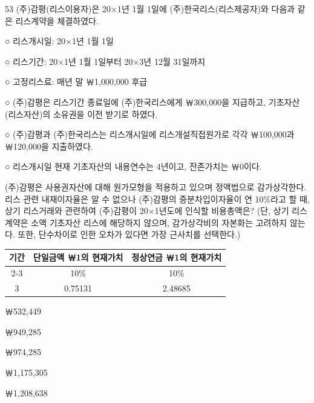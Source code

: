 \begin{question}{53}
(주)감평(리스이용자)은 20×1년 1월 1일에 (주)한국리스(리스제공자)와 다음과 같은 리스계약을 체결하였다.
\begin{framedtext}
○ 리스개시일: 20×1년 1월 1일 \par
○ 리스기간: 20×1년 1월 1일부터 20×3년 12월 31일까지 \par
○ 고정리스료: 매년 말 ￦1,000,000 후급 \par
○ (주)감평은 리스기간 종료일에 (주)한국리스에게 ￦300,000을 지급하고, 기초자산(리스자산)의 소유권을 이전 받기로 하였다. \par
○ (주)감평과 (주)한국리스는 리스개시일에 리스개설직접원가로 각각 ￦100,000과 ￦120,000을 지출하였다. \par
○ 리스개시일 현재 기초자산의 내용연수는 4년이고, 잔존가치는 ￦0이다. \par
\end{framedtext}
(주)감평은 사용권자산에 대해 원가모형을 적용하고 있으며 정액법으로 감가상각한다. 리스 관련 내재이자율은 알 수 없으나 (주)감평의 증분차입이자율이 연 10\%라고 할 때, 상기 리스거래와 관련하여 (주)감평이 20×1년도에 인식할 비용총액은? (단, 상기 리스계약은 소액 기초자산 리스에 해당하지 않으며, 감가상각비의 자본화는 고려하지 않는다. 또한, 단수차이로 인한 오차가 있다면 가장 근사치를 선택한다.)
\par{\small\centering\begin{tabular}{|c|c|c|}\hline
\multirow{2}{*}{기간} & 단일금액 ￦1의 현재가치 & 정상연금 ￦1의 현재가치 \\ \cline{2-3}
 & 10\% & 10\% \\ \hline
3 & 0.75131 & 2.48685 \\ \hline
\end{tabular}\par}
\begin{choices}
  \item ￦532,449
  \item ￦949,285
  \item ￦974,285
  \item ￦1,175,305
  \item ￦1,208,638
\end{choices}
\end{question}
